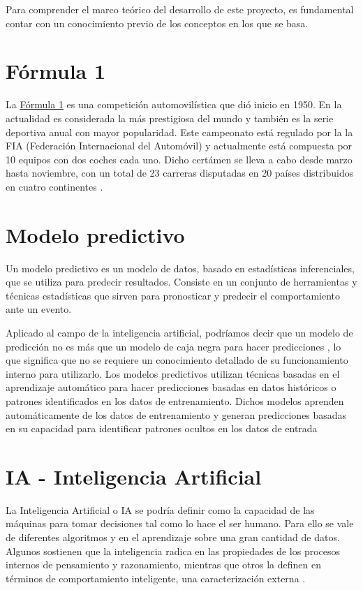
Para comprender el marco teórico del desarrollo de este proyecto, es fundamental contar con un conocimiento previo de los conceptos en los que se basa.


\section{Fórmula 1} 
La \href{https://www.formula1.com/}{Fórmula 1} es una competición automovilística que dió inicio en 1950. En la actualidad es considerada la más prestigiosa del mundo y también es la serie deportiva anual con mayor popularidad. Este campeonato está regulado por la la FIA (Federación Internacional del Automóvil) y actualmente está compuesta por 10 equipos con dos coches cada uno. Dicho certámen se lleva a cabo desde marzo hasta noviembre, con un total de 23 carreras disputadas en 20 países distribuidos en cuatro continentes \cite{f1:f1}.

\section{Modelo predictivo}

Un modelo predictivo es un modelo de datos, basado en estadísticas inferenciales, que se utiliza para predecir resultados. Consiste en un conjunto de herramientas y técnicas estadísticas que sirven para pronosticar y predecir el comportamiento ante un evento. 

Aplicado al campo de la inteligencia artificial, podríamos decir que un modelo de predicción no es más que un modelo de caja negra para hacer predicciones \cite{art:predictmodel}, lo que significa que no se requiere un conocimiento detallado de su funcionamiento interno para utilizarlo. Los modelos predictivos utilizan técnicas basadas en el aprendizaje automático para hacer predicciones basadas en datos históricos o patrones identificados en los datos de entrenamiento. Dichos modelos aprenden automáticamente de los datos de entrenamiento y generan predicciones basadas en su capacidad para identificar patrones ocultos en los datos de entrada

\section{IA - Inteligencia Artificial}

La Inteligencia Artificial o IA se podría definir como la capacidad de las máquinas para tomar decisiones tal como lo hace el ser humano. Para ello se vale de diferentes algoritmos y en el aprendizaje sobre una gran cantidad de datos. Algunos sostienen que la inteligencia radica en las propiedades de los procesos internos de pensamiento y razonamiento, mientras que otros la definen en términos de comportamiento inteligente, una caracterización externa \cite{aimodaproach}.

